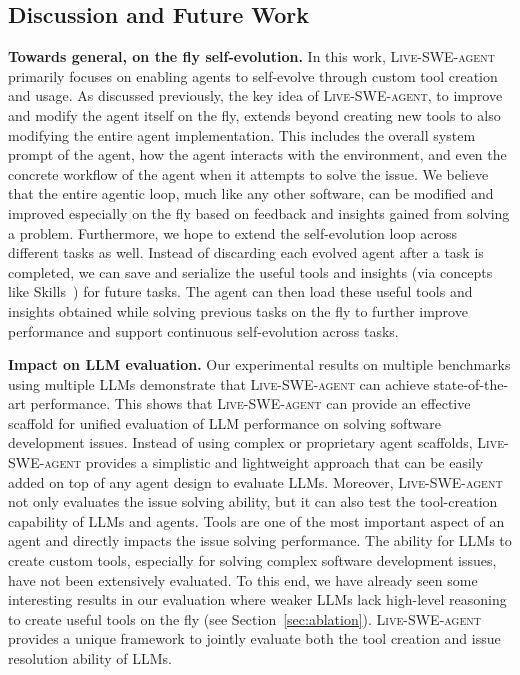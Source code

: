 \documentclass{article}
\newcommand{\tech}{\textsc{Live-SWE-agent}\xspace}
\renewcommand{\cite}{\citep}
\newcommand{\llm}{LLM\xspace}
\newcommand{\parabf}[1]{\vspace{.03in}\noindent \textbf{#1}}
\begin{document}
\subsection{Discussion and Future Work}

\parabf{Towards general, on the fly self-evolution.}
In this work, \tech primarily focuses on enabling agents to self-evolve through custom tool creation and usage.
As discussed previously, the key idea of \tech, to improve and modify the agent itself on the fly, extends beyond creating new tools to also modifying the entire agent implementation.
This includes the overall system prompt of the agent, how the agent interacts with the environment, and even the concrete workflow of the agent when it attempts to solve the issue.
We believe that the entire agentic loop, much like any other software, can be modified and improved especially on the fly based on feedback and insights gained from solving a problem.
Furthermore, we hope to extend the self-evolution loop across different tasks as well.
Instead of discarding each evolved agent after a task is completed, we can save and
serialize the useful tools and insights (via concepts like Skills~\cite{skills}) for future tasks.
The agent can then load these useful tools and insights obtained while solving previous tasks on the fly  
to further improve performance and support continuous self-evolution across tasks.

\parabf{Impact on \llm evaluation.}
Our experimental results on multiple benchmarks using multiple \llm{s} demonstrate that \tech can achieve state-of-the-art performance.
This shows that \tech can provide an effective scaffold for unified evaluation of \llm performance on solving software development issues.
Instead of using complex or proprietary agent scaffolds, \tech provides a simplistic and lightweight approach that can be easily added on top of any agent design to evaluate \llm{s}. 
Moreover, \tech not only evaluates the issue solving ability, but it can also test the tool-creation capability of \llm{s} and agents.
Tools are one of the most important aspect of an agent and directly impacts the issue solving performance.
The ability for \llm{s} to create custom tools, especially for solving complex software development issues, have not been extensively evaluated.
To this end, we have already seen some interesting results in our evaluation where weaker \llm{s} lack high-level reasoning to create useful tools on the fly (see Section~\ref{sec:ablation}).
\tech provides a unique framework to jointly evaluate both the tool creation and issue resolution ability of \llm{s}.
\end{document}

